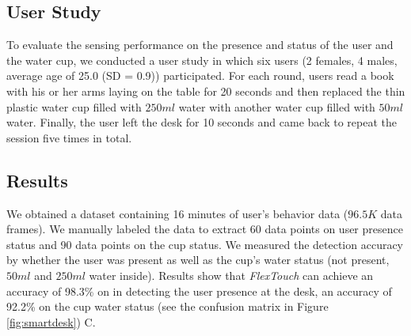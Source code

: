 
\subsection{User Study}
To evaluate the sensing performance on the presence and status of the user and the water cup, we conducted a user study in which six users (2 females, 4 males, average age of 25.0 (SD = 0.9)) participated. For each round, users read a book with his or her arms laying on the table for 20 seconds and then replaced the thin plastic water cup filled with $250 ml$ water with another water cup filled with $50 ml$ water. Finally, the user left the desk for 10 seconds and came back to repeat the session five times in total.

\subsection{Results}
We obtained a dataset containing 16 minutes of user's behavior data ($96.5 K$ data frames). We manually labeled the data to extract 60 data points on user presence status and 90 data points on the cup status. We measured the detection accuracy by whether the user was present as well as the cup's water status (not present, $50 ml$ and $250 ml$ water inside). Results show that \textit{FlexTouch} can achieve an accuracy of 98.3\% on in detecting the user presence at the desk, an accuracy of 92.2\% on the cup water status (see the confusion matrix in Figure \ref{fig:smartdesk}) C.

